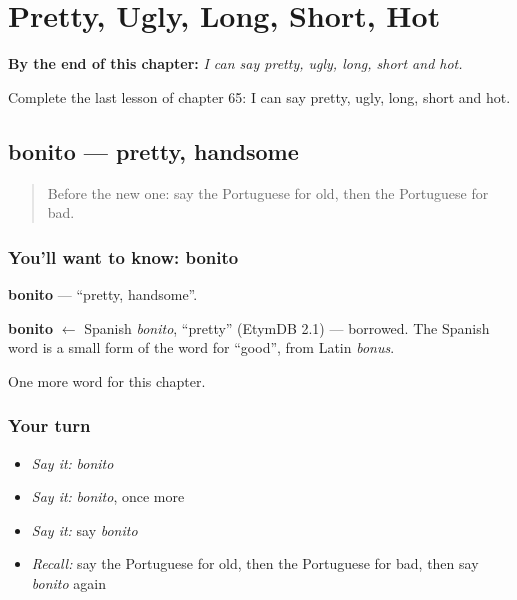 
\chapter{Pretty, Ugly, Long, Short, Hot}
\label{ch:pt-pretty-ugly-long-short-hot}

\begin{chapteropening}
\textbf{By the end of this chapter:} \emph{I can say pretty, ugly, long, short and hot.}

Complete the last lesson of chapter 65: I can say pretty, ugly, long, short and hot.
\end{chapteropening}

\section[bonito]{bonito — pretty, handsome}

\label{lesson:PT-C65-bonito}



\begin{quote}
Before the new one: say the Portuguese for old, then the Portuguese for bad.
\end{quote}

\subsection*{You'll want to know: bonito}
\textbf{bonito} — \textquotedblleft{}pretty, handsome\textquotedblright{}.

\begin{cousinweb}
\textbf{bonito} $\leftarrow$ Spanish \emph{bonito}, \textquotedblleft{}pretty\textquotedblright{} (EtymDB 2.1) — borrowed. The Spanish word is a small form of the word for \textquotedblleft{}good\textquotedblright{}, from Latin \emph{bonus}.
\end{cousinweb}

\begin{grammarlens}[title={What you've built}]
One more word for this chapter.
\end{grammarlens}

\subsection*{Your turn}
\begin{itemize}
\raggedright
  \item \emph{Say it:} \emph{bonito}
  \item \emph{Say it:} \emph{bonito}, once more
  \item \emph{Say it:} say \emph{bonito}
  \item \emph{Recall:} say the Portuguese for old, then the Portuguese for bad, then say \emph{bonito} again
\end{itemize}

